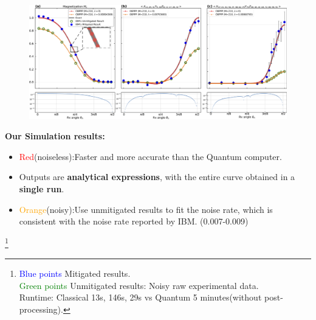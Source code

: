 \documentclass[10pt]{beamer}
\begin{document}
\begin{CJK}{UTF8}{gbsn}
 \begin{frame}[fragile]%
  \vspace{-1.5em}
    \begin{figure}
      \centering
    \includegraphics[width=1.05\textwidth]{fig/simibm1_zoom.png}
    \end{figure}
  \vspace{-1.5em}
  \textbf{Our Simulation results:}
  \vspace{-1em}
  \begin{itemize}
    \item \textcolor{red}{Red}(noiseless):Faster and more accurate than the Quantum computer.
    \item Outputs are \textbf{analytical expressions}, with the entire curve obtained in a \textbf{single run}.
    \item \textcolor{orange}{Orange}(noisy):Use unmitigated results to fit the noise rate, which is consistent with the noise rate reported by IBM. \small{(0.007-0.009)}
  \end{itemize}
  \vspace{-1em}
  \footnote{
    \textcolor{blue}{Blue points} Mitigated results.\\
  \textcolor{green}{Green points} Unmitigated results: Noisy raw experimental data.\\
  Runtime: Classical 13s, 146s, 29s vs Quantum 5 minutes(without post-processing).}
\end{frame}
\end{CJK}
\end{document}
